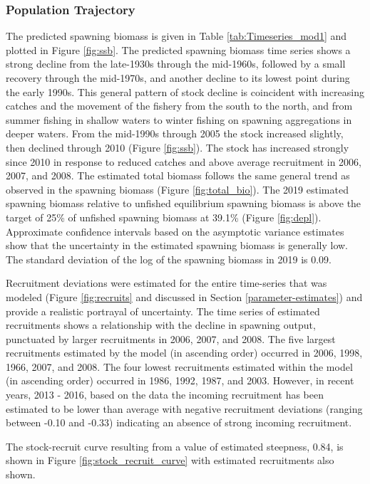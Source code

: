 \documentclass[12pt,]{article}
\begin{document}
\subsubsection{Population Trajectory}\label{population-trajectory}

The predicted spawning biomass is given in Table
\ref{tab:Timeseries_mod1} and plotted in Figure \ref{fig:ssb}. The
predicted spawning biomass time series shows a strong decline from the
late-1930s through the mid-1960s, followed by a small recovery through
the mid-1970s, and another decline to its lowest point during the early
1990s. This general pattern of stock decline is coincident with
increasing catches and the movement of the fishery from the south to the
north, and from summer fishing in shallow waters to winter fishing on
spawning aggregations in deeper waters. From the mid-1990s through 2005
the stock increased slightly, then declined through 2010 (Figure
\ref{fig:ssb}). The stock has increased strongly since 2010 in response
to reduced catches and above average recruitment in 2006, 2007, and
2008. The estimated total biomass follows the same general trend as
observed in the spawning biomass (Figure \ref{fig:total_bio}). The 2019
estimated spawning biomass relative to unfished equilibrium spawning
biomass is above the target of 25\% of unfished spawning biomass at
39.1\% (Figure \ref{fig:depl}). Approximate confidence intervals based
on the asymptotic variance estimates show that the uncertainty in the
estimated spawning biomass is generally low. The standard deviation of
the log of the spawning biomass in 2019 is 0.09.

Recruitment deviations were estimated for the entire time-series that
was modeled (Figure \ref{fig:recruits} and discussed in Section
\ref{parameter-estimates}) and provide a realistic portrayal of
uncertainty. The time series of estimated recruitments shows a
relationship with the decline in spawning output, punctuated by larger
recruitments in 2006, 2007, and 2008. The five largest recruitments
estimated by the model (in ascending order) occurred in 2006, 1998,
1966, 2007, and 2008. The four lowest recruitments estimated within the
model (in ascending order) occurred in 1986, 1992, 1987, and 2003.
However, in recent years, 2013 - 2016, based on the data the incoming
recruitment has been estimated to be lower than average with negative
recruitment deviations (ranging between -0.10 and -0.33) indicating an
absence of strong incoming recruitment.

The stock-recruit curve resulting from a value of estimated steepness,
0.84, is shown in Figure \ref{fig:stock_recruit_curve} with estimated
recruitments also shown.
\end{document}
